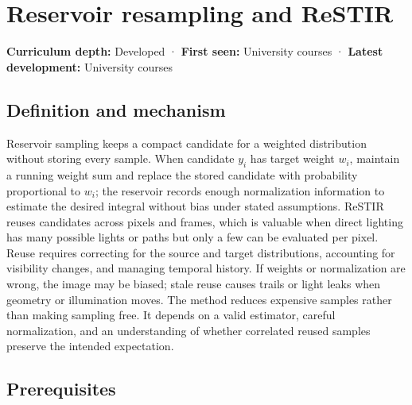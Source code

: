 \hypertarget{appendix-68be451b78b1}{}\label{referencestart:appendix-68be451b78b1}
\section{Reservoir resampling and ReSTIR}\label{appendix-68be451b78b1-reservoir-resampling-and-restir}

\textbf{Curriculum depth:} Developed · \textbf{First seen:} University courses · \textbf{Latest development:} University courses

\begin{allmightroledefinition}

\subsection{Definition and mechanism}\label{appendix-68be451b78b1-definition-and-mechanism}

Reservoir sampling keeps a compact candidate for a weighted distribution without storing every sample. When candidate \(y_i\) has target weight \(w_i\), maintain a running weight sum and replace the stored candidate with probability proportional to \(w_i\); the reservoir records enough normalization information to estimate the desired integral without bias under stated assumptions. ReSTIR reuses candidates across pixels and frames, which is valuable when direct lighting has many possible lights or paths but only a few can be evaluated per pixel. Reuse requires correcting for the source and target distributions, accounting for visibility changes, and managing temporal history. If weights or normalization are wrong, the image may be biased; stale reuse causes trails or light leaks when geometry or illumination moves. The method reduces expensive samples rather than making sampling free. It depends on a valid estimator, careful normalization, and an understanding of whether correlated reused samples preserve the intended expectation.

\end{allmightroledefinition}

\subsection{Prerequisites}\label{appendix-68be451b78b1-prerequisites}

